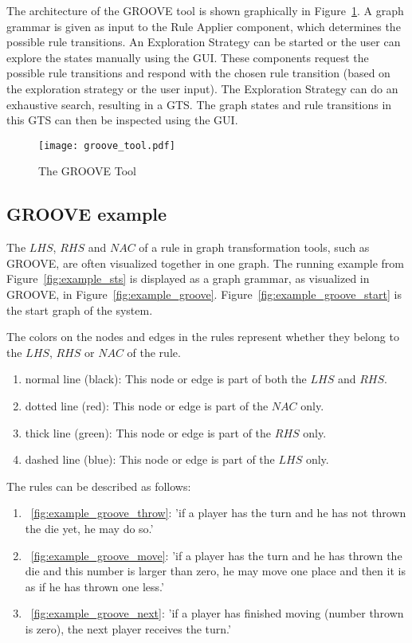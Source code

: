 The architecture of the GROOVE tool is shown graphically in Figure~\ref{fig:groove_tool}. A graph grammar is given as input to the Rule Applier component, which determines the possible rule transitions. An Exploration Strategy can be started or the user can explore the states manually using the GUI. These components request the possible rule transitions and respond with the chosen rule transition (based on the exploration strategy or the user input). The Exploration Strategy can do an exhaustive search, resulting in a GTS. The graph states and rule transitions in this GTS can then be inspected using the GUI.

\begin{figure}[h]
  \begin{center}
    \texttt{[image: groove\_tool.pdf]}
  \end{center}
  \caption{The GROOVE Tool}
  \label{fig:groove_tool}
\end{figure}

\subsection{GROOVE example}
The $\mathit{LHS}$, $\mathit{RHS}$ and $\mathit{NAC}$ of a rule in graph transformation tools, such as GROOVE, are often visualized together in one graph. The running example from Figure~\ref{fig:example_sts} is displayed as a graph grammar, as visualized in GROOVE, in Figure~\ref{fig:example_groove}. Figure~\ref{fig:example_groove_start} is the start graph of the system.

The colors on the nodes and edges in the rules represent whether they belong to the $\mathit{LHS}$, $\mathit{RHS}$ or $\mathit{NAC}$ of the rule.
\begin{enumerate}
  \item normal line (black): This node or edge is part of both the $\mathit{LHS}$ and $\mathit{RHS}$.
  \item dotted line (red): This node or edge is part of the $\mathit{NAC}$ only.
  \item thick line (green): This node or edge is part of the $\mathit{RHS}$ only.
  \item dashed line (blue): This node or edge is part of the $\mathit{LHS}$ only.
\end{enumerate}

The rules can be described as follows:
\begin{enumerate}
  \item~\ref{fig:example_groove_throw}: 'if a player has the turn and he has not thrown the die yet, he may do so.'
  \item~\ref{fig:example_groove_move}: 'if a player has the turn and he has thrown the die and this number is larger than zero, he may move one place and then it is as if he has thrown one less.'
  \item~\ref{fig:example_groove_next}: 'if a player has finished moving (number thrown is zero), the next player receives the turn.'
\end{enumerate}

